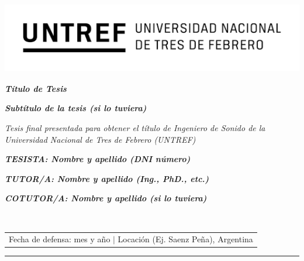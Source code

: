 \documentclass[12pt]{article}
\begin{document}
\begin{titlepage}
\centering
\includegraphics[width=13.58cm, height=3.1cm]{Logo Untref.png} 

\vspace{0.1cm}

\hspace*{-1.31cm}%
\begin{minipage}[t]{16cm}
\centering
{}
\vspace{0.5cm} %

\end{minipage}


\vspace{36pt}

{\bfseries\itshape\fontsize{22pt}{24pt} \selectfont Título de Tesis \par}

\vspace{22pt}

{\itshape\fontsize{18pt}{24pt}\selectfont \textbf{Subtítulo de la tesis (si lo tuviera)} \par}

\vspace{44pt}

{\itshape\fontsize{14pt}{24pt}\selectfont Tesis final presentada para obtener el título de Ingeniero de Sonido de la Universidad Nacional de Tres de Febrero (UNTREF) \par}

\vspace{70pt}

{\bfseries\itshape\fontsize{14pt}{0pt}\selectfont TESISTA: Nombre y apellido (DNI número) \par}
{\bfseries\itshape\fontsize{14pt}{0pt}\selectfont TUTOR/A: Nombre y apellido (Ing., PhD., etc.) \par}
{\bfseries\itshape\fontsize{14pt}{0pt}\selectfont COTUTOR/A: Nombre y apellido (si lo tuviera) \par}

\vfill

\begin{table}[h]
\hrulefill \\ 
\begin{tabular}{c}
Fecha de defensa: mes y año $\lvert$ Locación (Ej. Saenz Peña), Argentina \\
\end{tabular}
\end{table}
\hrule
\end{titlepage}
\end{document}
